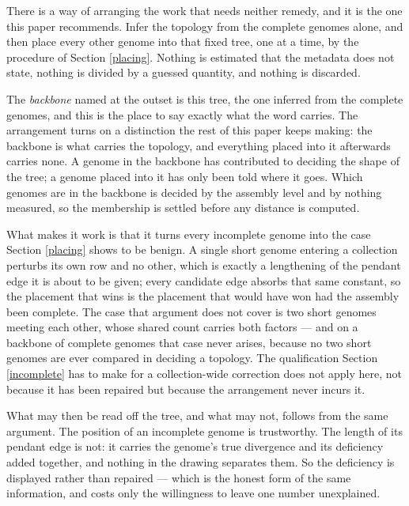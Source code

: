 \documentclass[pdflatex,sn-vancouver-num]{sn-jnl}
\begin{document}
There is a way of arranging the work that needs neither remedy, and it is the one this paper
recommends. Infer the topology from the complete genomes alone, and then place every other genome into
that fixed tree, one at a time, by the procedure of Section \ref{placing}. Nothing is estimated that
the metadata does not state, nothing is divided by a guessed quantity, and nothing is discarded.

The \emph{backbone} named at the outset is this tree, the one inferred from the complete genomes, and
this is the place to say exactly what the word carries. The arrangement turns on a distinction the
rest of this paper keeps making: the backbone is what carries the topology, and everything placed into
it afterwards carries none. A genome in the backbone
has contributed to deciding the shape of the tree; a genome placed into it has only been told where it
goes. Which genomes are in the backbone is decided by the assembly level and by nothing measured, so
the membership is settled before any distance is computed.

What makes it work is that it turns every incomplete genome into the case
Section \ref{placing} shows to be benign. A single short genome entering a collection perturbs its own
row and no other, which is exactly a lengthening of the pendant edge it is about to be given; every
candidate edge absorbs that same constant, so the placement that wins is the placement that would have
won had the assembly been complete. The case that argument does not cover is two short genomes meeting
each other, whose shared count carries both factors --- and on a backbone of complete genomes that
case never arises, because no two short genomes are ever compared in deciding a topology. The
qualification Section \ref{incomplete} has to make for a collection-wide correction does not apply
here, not because it has been repaired but because the arrangement never incurs it.

What may then be read off the tree, and what may not, follows from the same argument. The position of
an incomplete genome is trustworthy. The length of its pendant edge is not: it carries the genome's
true divergence and its deficiency added together, and nothing in the drawing separates them. So the
deficiency is displayed rather than repaired --- which is the honest form of the same information, and
costs only the willingness to leave one number unexplained.
\end{document}
